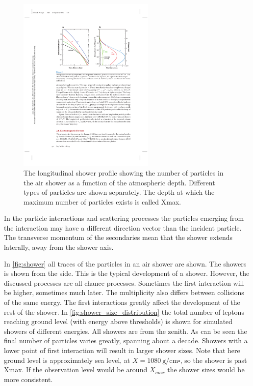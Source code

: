 \begin{figure}
    \centering
    \includegraphics[width=0.6\textwidth]
                    {plots/cosmic-rays/longitudinal_profile}
    \caption{The longitudinal shower profile showing the number of particles in the air shower as a function of the atmospheric depth. Different types of particles are shown separately. The depth at which the maximum number of particles exists is called Xmax. \cite{engel2011eas}}
    \label{fig:longitudinal_profile}
\end{figure}

In the particle interactions and scattering processes the particles emerging from the interaction may have a different direction vector than the incident particle. The transverse momentum of the secondaries mean that the shower extends laterally, away from the shower axis.

In \cref{fig:shower} all traces of the particles in an air shower are shown. The showers is shown from the side. This is the typical development of a shower. However, the discussed processes are all chance processes. Sometimes the first interaction will be higher, sometimes much later. The multiplicity also differs between collisions of the same energy. The first interactions greatly affect the development of the rest of the shower. In \cref{fig:shower_size_distribution} the total number of leptons reaching ground level (with energy above thresholds) is shown for simulated showers of different energies. All showers are from the zenith. As can be seen the final number of particles varies greatly, spanning about a decade. Showers with a lower point of first interaction will result in larger shower sizes. Note that  here ground level is approximately sea level, at $X = \SI{1080}{\gram\per\centi\meter\square}$, so the shower is past Xmax. If the observation level would be around $X_{max}$ the shower sizes would be more consistent.

